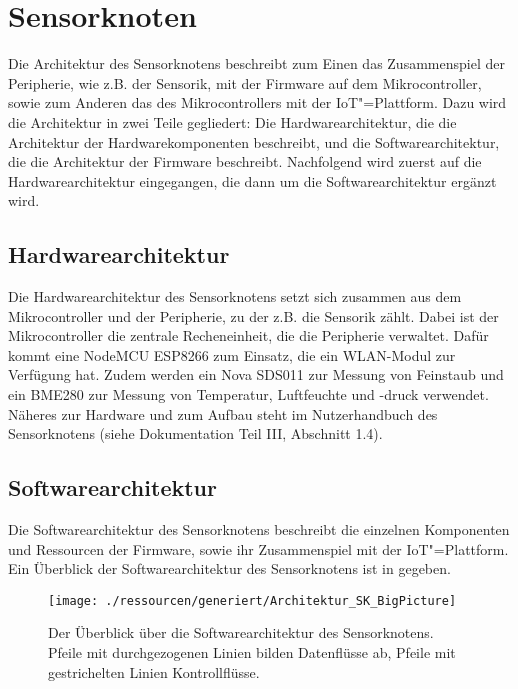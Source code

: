 \section{Sensorknoten}
\label{sec:arch:sk}
Die Architektur des Sensorknotens beschreibt zum Einen das Zusammenspiel der Peripherie, wie z.B. der Sensorik, mit der Firmware auf dem Mikrocontroller, sowie zum Anderen das des Mikrocontrollers mit der IoT"=Plattform.
Dazu wird die Architektur in zwei Teile gegliedert: Die Hardwarearchitektur, die die Architektur der Hardwarekomponenten beschreibt, und die Softwarearchitektur, die die Architektur der Firmware beschreibt.
Nachfolgend wird zuerst auf die Hardwarearchitektur eingegangen, die dann um die Softwarearchitektur ergänzt wird.

\subsection{Hardwarearchitektur}
Die Hardwarearchitektur des Sensorknotens setzt sich zusammen aus dem Mikrocontroller und der Peripherie, zu der z.B. die Sensorik zählt.
Dabei ist der Mikrocontroller die zentrale Recheneinheit, die die Peripherie verwaltet.
Dafür kommt eine NodeMCU ESP8266 zum Einsatz, die ein WLAN-Modul zur Verfügung hat.
Zudem werden ein Nova SDS011 zur Messung von Feinstaub und ein BME280 zur Messung von Temperatur, Luftfeuchte und -druck verwendet.
Näheres zur Hardware und zum Aufbau steht im Nutzerhandbuch des Sensorknotens (siehe Dokumentation Teil III, Abschnitt 1.4).

\subsection{Softwarearchitektur}
Die Softwarearchitektur des Sensorknotens beschreibt die einzelnen Komponenten und Ressourcen der Firmware, sowie ihr Zusammenspiel mit der IoT"=Plattform.
Ein Überblick der Softwarearchitektur des Sensorknotens ist in  gegeben.

\begin{figure}[!htb]
\centering
    \texttt{[image: ./ressourcen/generiert/Architektur\_SK\_BigPicture]}
    \caption[Der Überblick über die Softwarearchitektur des Sensorknotens]{Der Überblick über die Softwarearchitektur des Sensorknotens. Pfeile mit durchgezogenen Linien bilden Datenflüsse ab, Pfeile mit gestrichelten Linien Kontrollflüsse.}
    \label{fig:Architektur_SK_BigPicture}
\end{figure}

